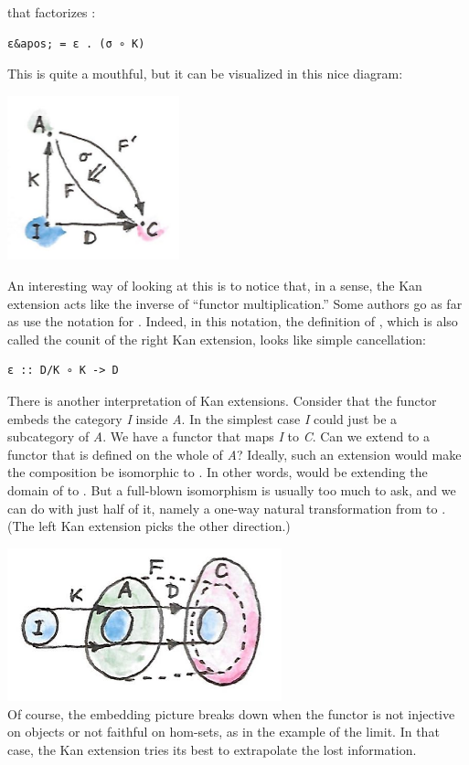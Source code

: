 that factorizes :

\begin{verbatim}
ε&apos; = ε . (σ ∘ K)
\end{verbatim}

This is quite a mouthful, but it can be visualized in this nice diagram:

\includegraphics[width=1.95833in]{images/kan7.jpg}

An interesting way of looking at this is to notice that, in a sense, the
Kan extension acts like the inverse of ``functor multiplication.'' Some
authors go as far as use the notation  for .
Indeed, in this notation, the definition of , which is also
called the counit of the right Kan extension, looks like simple
cancellation:

\begin{verbatim}
ε :: D/K ∘ K -> D
\end{verbatim}

There is another interpretation of Kan extensions. Consider that the
functor  embeds the category \emph{I} inside \emph{A}. In the
simplest case \emph{I} could just be a subcategory of \emph{A}. We have
a functor  that maps \emph{I} to \emph{C}. Can we extend
 to a functor  that is defined on the whole of
\emph{A}? Ideally, such an extension would make the composition
 be isomorphic to . In other words, 
would be extending the domain of  to . But a
full-blown isomorphism is usually too much to ask, and we can do with
just half of it, namely a one-way natural transformation  from
 to . (The left Kan extension picks the other
direction.)

\includegraphics[width=3.12500in]{images/kan6.jpg}\\
Of course, the embedding picture breaks down when the functor 
is not injective on objects or not faithful on hom-sets, as in the
example of the limit. In that case, the Kan extension tries its best to
extrapolate the lost information.

